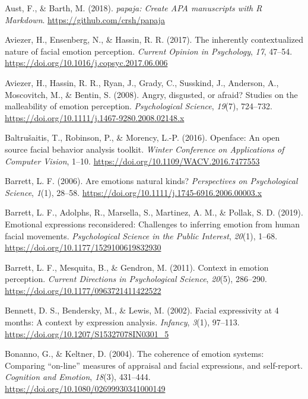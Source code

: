 \documentclass[
  english,
  man]{apa7}
\newlength{\cslhangindent}
\newenvironment{cslreferences}%
  {\setlength{\parindent}{0pt}%
  \everypar{\setlength{\hangindent}{\cslhangindent}}\ignorespaces}%
  {\par}
\begin{document}
\hypertarget{refs}{}
\begin{cslreferences}
\leavevmode\hypertarget{ref-R-papaja}{}%
Aust, F., \& Barth, M. (2018). \emph{papaja: Create APA manuscripts with R Markdown}. \url{https://github.com/crsh/papaja}

\leavevmode\hypertarget{ref-aviezer2017inherently}{}%
Aviezer, H., Ensenberg, N., \& Hassin, R. R. (2017). The inherently contextualized nature of facial emotion perception. \emph{Current Opinion in Psychology}, \emph{17}, 47--54. \url{https://doi.org/10.1016/j.copsyc.2017.06.006}

\leavevmode\hypertarget{ref-aviezer2008angry}{}%
Aviezer, H., Hassin, R. R., Ryan, J., Grady, C., Susskind, J., Anderson, A., Moscovitch, M., \& Bentin, S. (2008). Angry, disgusted, or afraid? Studies on the malleability of emotion perception. \emph{Psychological Science}, \emph{19}(7), 724--732. \url{https://doi.org/10.1111/j.1467-9280.2008.02148.x}

\leavevmode\hypertarget{ref-baltruvsaitis2016openface}{}%
Baltrušaitis, T., Robinson, P., \& Morency, L.-P. (2016). Openface: An open source facial behavior analysis toolkit. \emph{Winter Conference on Applications of Computer Vision}, 1--10. \url{https://doi.org/10.1109/WACV.2016.7477553}

\leavevmode\hypertarget{ref-barrett2006emotions}{}%
Barrett, L. F. (2006). Are emotions natural kinds? \emph{Perspectives on Psychological Science}, \emph{1}(1), 28--58. \url{https://doi.org/10.1111/j.1745-6916.2006.00003.x}

\leavevmode\hypertarget{ref-barrett2019emotional}{}%
Barrett, L. F., Adolphs, R., Marsella, S., Martinez, A. M., \& Pollak, S. D. (2019). Emotional expressions reconsidered: Challenges to inferring emotion from human facial movements. \emph{Psychological Science in the Public Interest}, \emph{20}(1), 1--68. \url{https://doi.org/10.1177/1529100619832930}

\leavevmode\hypertarget{ref-barrett2011context}{}%
Barrett, L. F., Mesquita, B., \& Gendron, M. (2011). Context in emotion perception. \emph{Current Directions in Psychological Science}, \emph{20}(5), 286--290. \url{https://doi.org/10.1177/0963721411422522}

\leavevmode\hypertarget{ref-bennett2002facial}{}%
Bennett, D. S., Bendersky, M., \& Lewis, M. (2002). Facial expressivity at 4 months: A context by expression analysis. \emph{Infancy}, \emph{3}(1), 97--113. \url{https://doi.org/10.1207/S15327078IN0301_5}

\leavevmode\hypertarget{ref-bonanno2004brief}{}%
Bonanno, G., \& Keltner, D. (2004). The coherence of emotion systems: Comparing ``on-line'' measures of appraisal and facial expressions, and self-report. \emph{Cognition and Emotion}, \emph{18}(3), 431--444. \url{https://doi.org/10.1080/02699930341000149}


\end{cslreferences}
\end{document}
